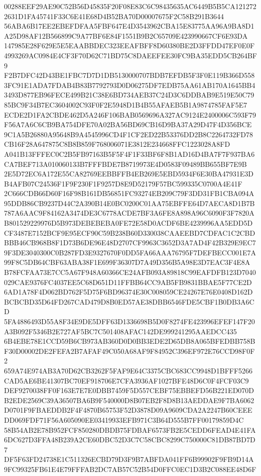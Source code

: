 \documentclass[UTF8,fontset=fandol,zihao=-4,a4paper]{ctexart}
\begin{document}
{{00288EEF29AE90C52B56D45835F20F08E83C6C98435635AC6449B5B5CA1212722631D1FA45741F33C6E41E68D4B52BA70D00007675F2C58B291B3644
56ABA6B17EE2EBEFDFAA5FBF647E4D3543962CBA15E83775AA96A9BA8D1A25D98AF12B566899C9A77BF6E84F1551B9B2C65709E423990667CF6E93DA
147985E28F629E5E5EAABBDEC323EEAFBFF8D60380BE2D3FFDD47EF0E0F4993269AC0984E4CF3F70D62C71BD75C8DAEEFEE30FC9BA35EDD5CB264BF9
F2B7DFC42D43BE1FBC7D7D1DB5130000707BDB7EFDB5F3F0E119B366D5583FC91E1ADA7FDAB4B83B7792793D0D06275DF7EDB75AA61AB170A1645BB4
3493D877EB96FECE499B21C38E6BD734AEB37C24D3C6DDBAB9E519E50C7985BC9F34B7EC3604002C93F0F2E5948D1B4B55AFAEB5B1A9874785FAF5E7
ECDE2D1FA2CBDE462D5A246F106BAB0569696A327AC9124E2400006C593F79F56A7A6C6CB9BA754DFE70A02BA56BD69CB16D9BA37A29D47F4D356BCE
9C1A5B26880A95648B9A4545996CD4F1CF2ED22B53376DD2B8C2264732FD78CB16F28A647875C8B8B859F768006071E3812E234668FFC1223028A8FD
A041B13FFFEC0C2B5FB97163B5F5F4F1F33BF6F8B1AD16D4BA7F7F937BA6CA7BEF713A010060133B7FFFBDE7B8719973E4D0583F09489BB655BF7E9B
2E5D72EC6A172E55CA82769EEBBFFB4EB269E5EBD5934F6E30BA47931E3DB4AFB07C24536F1F9F230F1F9257D8E9D52179F57BC599335C0700A4E41F
2C666CDB66D60F16F98B161DB56851FC93274EB209C79F3DD31FB1CBA094A95DDB86CB9237D44C2A390B14E0BC0200C01AA75EBFFE64D7AECA8D1B7B
787A6AAC9F84162A3474DE3C6778ACDE7BF3A6FE8A898A96C6090F3F7820AB801529229976D5B973DEBEBEBA0FE72E58D0ACDF6BE4239996AA5EDD5D
CF3487E7152BCF9E95ECF90C59B238B60D330038CAAEEBD7CDFAC1C2CBDBBB46CB968B8F1D73B6DE96E48D2707CF9963C3652D3A7AD4F42B329E9EC7
9F3DE3040300C0B287FD3E9327670F0DD5FA66AAA76795F7DEFBECC001E7A99F8C5DB64CBF63ABA38F1E699F36307D7A49D356B5A98E3D7EAC3F4E8A
B78FCFAA73E7CC5A67F948A60366CE24AFB093A89818C99EAFDFB123D7040029CAE9376FC4037EE5C68D651D11FFBB64CC9AB5FB9831BBAE5F77CE2D
6AD1A78F4D062BD762F5D75F6BD96374E30C008059CE24267E76E0408D162DBCBCBD35D64FD267CAD479D8B0ED57AE38DBB6546FDE5CBF1B0DB3A6CD
5FA4886493D55A8F34E9DE5DFF63D1336698B5D0F8274FE423996EFEF147F20A3B092F5346B2E727AF5BC7C501408AFAC142DE999241295AAEDCC435
6B4EBE78E1CCD59B6CB973AB360D0D0BB3EDE2D65DB8A065BFEDBB758BF30D00002DE2FEFA2B7AFAF49C050A68AF9F84952C396EF972E76CCD98F0F2
659A74E974AB3A70D62CB3262F5FAF9E64C3375CBC683CC9948D1BFFF5266CAD5AE6BE41307BC70EF918706E7CFA3936AF1027BFE48D6C0F4FCF03C9
DEF9270038FF0F163E7E7E0DBB7459F5D557CEBF75EBBEFD56B221ED070DB2EDE2569C39A36507BA6B9F540000D8B07EB2F8D8B13AEDDAE9F7BA6062
D0701F9FBAEDDB2F4F4870B65753F52D3878D09A9609CDA2A2247B60CEEEDD069FDF71F56A605090EE03419933EFB971C3B64D555B7FF00179859D4C
58B54AB2E78B952FCF850280DBDB75FDBAF6573FB2E5CEDD6FEAD4E41FA6DC627D3FFA48B239A2CE60DBC52D3C7C58CBC8299C750000C81DB87BD7D7
DF5F63FD24738E1C511326ECBD79D3F9B7ABFDA041FF6B99902F9FB9D14A9FC99325FB61E4E79FFFAB2DC7AB57C52B54D0FFC0EC1D3B2C088EE48D6F
}}
\end{document}
